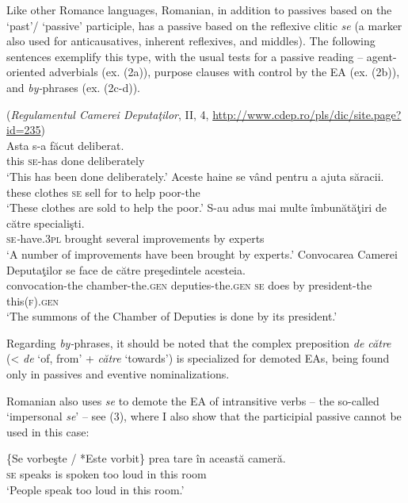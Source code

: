 \documentclass[output=paper]{langsci/langscibook}
\begin{document}
Like other Romance languages, Romanian, in addition to passives based on the ‘past’/ ‘passive’ participle, has a passive based on the reflexive clitic \textit{se} (a marker also used for anticausatives, inherent reflexives, and middles). The following sentences exemplify this type, with the usual tests for a passive reading – agent-oriented adverbials (ex. (2a)), purpose clauses with control by the EA (ex. (2b)), and \textit{by-}phrases (ex. (2c-d)).   

\ea%
    (\textit{Regulamentul Camerei Deputaţilor}, II, 4, \url{http://www.cdep.ro/pls/dic/site.page?id=235})\label{ex:giurgea:2}\\
    \ea
    \gll Asta s-a      făcut deliberat.\\
         this  \textsc{se}{}-has done  deliberately\\
    \glt ‘This has been done deliberately.’
    \ex
    \gll Aceste haine   se vând pentru a ajuta săracii.\\
         these   clothes \textsc{se} sell   for      to help poor-the\\
    \glt  ‘These clothes are sold to help the poor.’
    \ex
    \gll S{}-au              adus     mai multe îmbunătăţiri    de către specialişti.\\
         \textsc{se}\textit{{}-}have.\textsc{3pl} brought several      improvements by         experts\\
    \glt ‘A number of improvements have been brought by experts.’
    \ex
    \gll Convocarea      Camerei                Deputaţilor           se  face de către preşedintele  acesteia.\\
         convocation-the chamber-the.\textsc{gen} deputies-the.\textsc{gen}  \textsc{se} does by    president-the this(\textsc{f).gen}\\
    \glt ‘The summons of the Chamber of Deputies is done by its president.’
    \z
\z

Regarding \textit{by-}phrases, it should be noted that the complex preposition \textit{de către} (< \textit{de} ‘of, from’ + \textit{către} ‘towards’) is specialized for demoted EAs, being found only in passives and eventive nominalizations.

Romanian also uses \textit{se} to demote the EA of intransitive verbs – the so-called ‘impersonal \textit{se}’ – see (3), where I also show that the participial passive cannot be used in this case:

\ea%
    \label{ex:giurgea:3}
    \gll \{Se vorbeşte / *Este vorbit\} prea tare în această cameră.\\
         \textsc{se} speaks       is      spoken too  loud in this       room\\
    \glt ‘People speak too loud in this room.’
    \z
\end{document}
